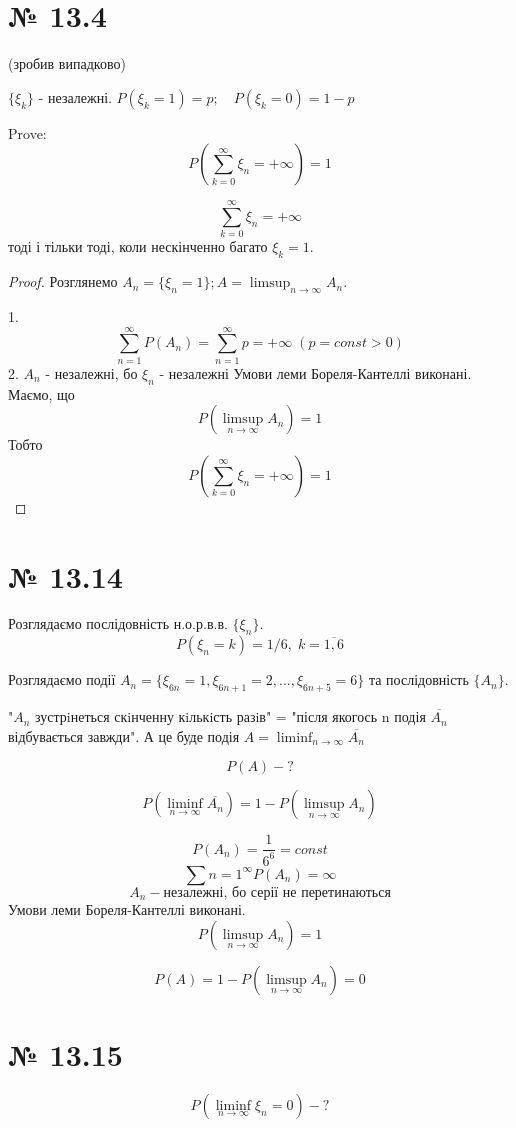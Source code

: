\documentclass[11pt, a4paper]{article} %
\begin{document}

\section*{№ 13.4}
(зробив випадково)
\begin{mdframed}
    $\{\xi_k\}$ - незалежні.
    $P(\xi_k = 1) = p;\quad P(\xi_k = 0) = 1-p$

    Prove:
    $$P(\sum_{k=0}^\infty \xi_n = +\infty) = 1$$
\end{mdframed}

$$\sum_{k=0}^\infty \xi_n = +\infty$$
тоді і тільки тоді, коли нескінченно багато $\xi_k = 1$.
\begin{proof}
    Розглянемо
    $A_n = \{\xi_n = 1\}; A = \limsup_{n\to\infty} A_n$.
    
    1. $$\sum_{n=1}^\infty P(A_n) = \sum_{n=1}^\infty p = +\infty \; (p=const >0)$$
    2. $A_n$ - незалежні, бо $\xi_n$ - незалежні
    Умови леми Бореля-Кантеллі виконані. Маємо, що 
    $$P(\limsup_{n\to\infty} A_n) = 1$$
    Тобто 
    $$P(\sum_{k=0}^\infty \xi_n = +\infty) = 1$$
\end{proof}

\section*{№ 13.14}
Розглядаємо послідовність н.о.р.в.в. $\{\xi_n\}$.
$$P(\xi_n = k) = 1/6,\; k = \overline{1,6}$$

Розглядаємо події $A_n = \{\xi_{6n} = 1, \xi_{6n+1} = 2, ..., \xi_{6n+5} = 6\}$
та послідовність $\{A_n\}$.

"$A_n$ зустрiнеться скiнченну кiлькiсть разiв" = "після якогось n подія $\overline{A_n}$ відбувається завжди".
А це буде подія $A = \liminf_{n\to\infty} \overline{A_n}$

$$P(A) - ?$$

$$P(\liminf_{n\to\infty} \overline{A_n}) = 1 - P(\limsup_{n\to\infty} A_n)$$

$$P(A_n) = \frac{1}{6^6} = const$$
$$\sum{n=1}^\infty P(A_n) = \infty$$
$$A_n - \text{незалежні, бо серії не перетинаються}$$
Умови леми Бореля-Кантеллі виконані. 
$$P(\limsup_{n\to\infty} A_n) = 1$$

\begin{mdframed}[style=ans]
    $$P(A) = 1 - P(\limsup_{n\to\infty} A_n) = 0$$
\end{mdframed}

\section*{№ 13.15}
$$P(\liminf_{n\to\infty} \xi_n = 0) - ?$$
\end{document}
